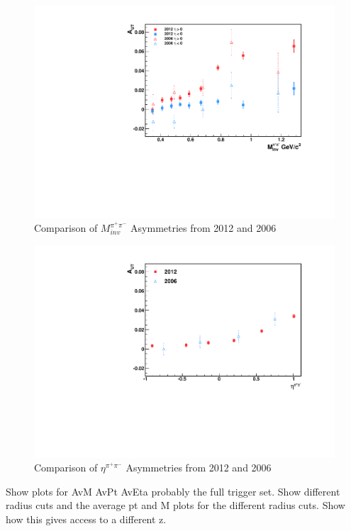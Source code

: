 \documentclass[abstract = on,listof=totoc, bibliography=totoc]{scrreprt}
\newcommand{\mpair}{M_{inv}^{\pi^+\pi^-}}
\newcommand{\etapair}{\eta^{\pi^+\pi^-}}
\begin{document}
\begin{figure}
\begin{center}
\includegraphics[width = .7\textwidth]{asymsHiLoAnselm_Mass_8_24_15}
\caption[$\mpair$ Asymmetries 2012 and 2006]{Comparison of $\mpair$ Asymmetries from 2012 and 2006}
\label{fig:compMass}
\end{center}
\end{figure}

\begin{figure}
\begin{center}
\includegraphics[width = .7\textwidth]{asymsHiLoAnselm_Eta_8_24_15}
\caption[$\etapair$ Asymmetries 2012 and 2006]{Comparison of $\etapair$ Asymmetries from 2012 and 2006}
\label{fig:compEta}
\end{center}
\end{figure}





Show plots for AvM AvPt AvEta probably the full trigger set. Show different radius cuts and the average pt and M plots for the different radius cuts. Show how this gives access to a different z.
\end{document}
